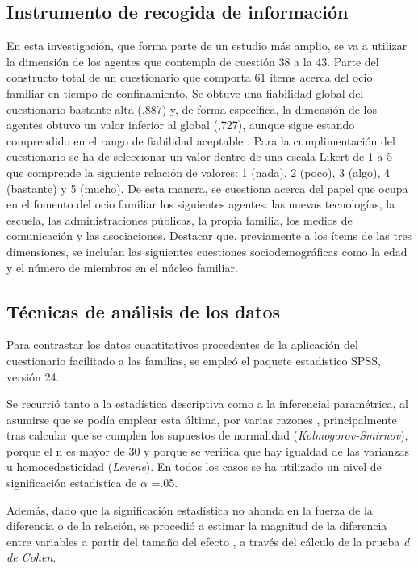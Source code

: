 \documentclass[spanish]{textolivre}
\begin{document}
\subsection{Instrumento de recogida de información}
En esta investigación, que forma parte de un estudio más amplio, se va a utilizar la dimensión de los agentes que contempla de cuestión 38 a la 43. Parte del constructo total de un cuestionario que comporta 61 ítems acerca del ocio familiar en tiempo de confinamiento. Se obtuve una fiabilidad global del cuestionario bastante alta (,887) y, de forma específica, la dimensión de los agentes obtuvo un valor inferior al global (,727), aunque sigue estando comprendido en el rango de fiabilidad aceptable \cite{celina2005}. Para la cumplimentación del cuestionario se ha de seleccionar un valor dentro de una escala Likert de 1 a 5 que comprende la siguiente relación de valores: 1 (nada), 2 (poco), 3 (algo), 4 (bastante) y 5 (mucho). De esta manera, se cuestiona acerca del papel que ocupa en el fomento del ocio familiar los siguientes agentes: las nuevas tecnologías, la escuela, las administraciones públicas, la propia familia, los medios de comunicación y las asociaciones. Destacar que, previamente a los ítems de las tres dimensiones, se incluían las siguientes cuestiones sociodemográficas como la edad y el número de miembros en el núcleo familiar. 

\subsection{Técnicas de análisis de los datos}
Para contrastar los datos cuantitativos procedentes de la aplicación del cuestionario facilitado a las familias, se empleó el paquete estadístico SPSS, versión 24. 

Se recurrió tanto a la estadística descriptiva como a la inferencial paramétrica, al asumirse que se podía emplear esta última, por varias razones \cite{siegel1991}, principalmente tras calcular que se cumplen los supuestos de normalidad (\emph{Kolmogorov-Smirnov}), porque el n es mayor de 30 y porque se verifica que hay igualdad de las varianzas u homocedasticidad (\emph{Levene}). En todos los casos se ha utilizado un nivel de significación estadística de $\alpha$ =.05. 

Además, dado que la significación estadística no ahonda en la fuerza de la diferencia o de la relación, se procedió a estimar la magnitud de la diferencia entre variables a partir del tamaño del efecto \cite{cohen1988}, a través del cálculo de la prueba \emph{d de Cohen}.
\end{document}
